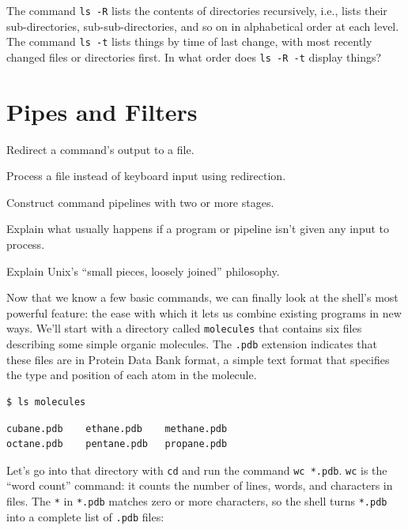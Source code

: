 \documentclass{book}
\begin{document}
\begin{challenge}
  The command \texttt{ls -R} lists the contents of directories
  recursively, i.e., lists their sub-directories, sub-sub-directories,
  and so on in alphabetical order at each level. The command
  \texttt{ls -t} lists things by time of last change, with most recently
  changed files or directories first. In what order does
  \texttt{ls -R -t} display things?
\end{challenge}

\section{Pipes and Filters}

\begin{objectives}
\begin{swcitemize}
\item
  Redirect a command's output to a file.
\item
  Process a file instead of keyboard input using redirection.
\item
  Construct command pipelines with two or more stages.
\item
  Explain what usually happens if a program or pipeline isn't given any
  input to process.
\item
  Explain Unix's ``small pieces, loosely joined'' philosophy.
\end{swcitemize}
\end{objectives}

Now that we know a few basic commands, we can finally look at the
shell's most powerful feature: the ease with which it lets us combine
existing programs in new ways. We'll start with a directory called
\texttt{molecules} that contains six files describing some simple
organic molecules. The \texttt{.pdb} extension indicates that these
files are in Protein Data Bank format, a simple text format that
specifies the type and position of each atom in the molecule.

\begin{verbatim}
$ ls molecules
\end{verbatim}

\begin{verbatim}
cubane.pdb    ethane.pdb    methane.pdb
octane.pdb    pentane.pdb   propane.pdb
\end{verbatim}

Let's go into that directory with \texttt{cd} and run the command
\texttt{wc *.pdb}. \texttt{wc} is the ``word count'' command: it counts
the number of lines, words, and characters in files. The \texttt{*} in
\texttt{*.pdb} matches zero or more characters, so the shell turns
\texttt{*.pdb} into a complete list of \texttt{.pdb} files:
\end{document}
